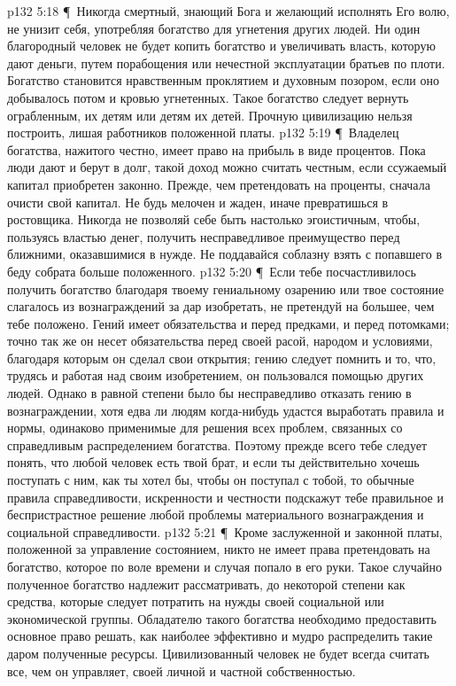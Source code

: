 \vs p132 5:18 \P\ \bibnobreakspace Никогда смертный, знающий Бога и желающий исполнять Его волю, не унизит себя, употребляя богатство для угнетения других людей. Ни один благородный человек не будет копить богатство и увеличивать власть, которую дают деньги, путем порабощения или нечестной эксплуатации братьев по плоти. Богатство становится нравственным проклятием и духовным позором, если оно добывалось потом и кровью угнетенных. Такое богатство следует вернуть ограбленным, их детям или детям их детей. Прочную цивилизацию нельзя построить, лишая работников положенной платы.
\vs p132 5:19 \P\ \bibnobreakspace Владелец богатства, нажитого честно, имеет право на прибыль в виде процентов. Пока люди дают и берут в долг, такой доход можно считать честным, если ссужаемый капитал приобретен законно. Прежде, чем претендовать на проценты, сначала очисти свой капитал. Не будь мелочен и жаден, иначе превратишься в ростовщика. Никогда не позволяй себе быть настолько эгоистичным, чтобы, пользуясь властью денег, получить несправедливое преимущество перед ближними, оказавшимися в нужде. Не поддавайся соблазну взять с попавшего в беду собрата больше положенного.
\vs p132 5:20 \P\ \bibnobreakspace Если тебе посчастливилось получить богатство благодаря твоему гениальному озарению или твое состояние слагалось из вознаграждений за дар изобретать, не претендуй на большее, чем тебе положено. Гений имеет обязательства и перед предками, и перед потомками; точно так же он несет обязательства перед своей расой, народом и условиями, благодаря которым он сделал свои открытия; гению следует помнить и то, что, трудясь и работая над своим изобретением, он пользовался помощью других людей. Однако в равной степени было бы несправедливо отказать гению в вознаграждении, хотя едва ли людям когда\hyp{}нибудь удастся выработать правила и нормы, одинаково применимые для решения всех проблем, связанных со справедливым распределением богатства. Поэтому прежде всего тебе следует понять, что любой человек есть твой брат, и если ты действительно хочешь поступать с ним, как ты хотел бы, чтобы он поступал с тобой, то обычные правила справедливости, искренности и честности подскажут тебе правильное и беспристрастное решение любой проблемы материального вознаграждения и социальной справедливости.
\vs p132 5:21 \P\ \bibnobreakspace Кроме заслуженной и законной платы, положенной за управление состоянием, никто не имеет права претендовать на богатство, которое по воле времени и случая попало в его руки. Такое случайно полученное богатство надлежит рассматривать, до некоторой степени как средства, которые следует потратить на нужды своей социальной или экономической группы. Обладателю такого богатства необходимо предоставить основное право решать, как наиболее эффективно и мудро распределить такие даром полученные ресурсы. Цивилизованный человек не будет всегда считать все, чем он управляет, своей личной и частной собственностью.

